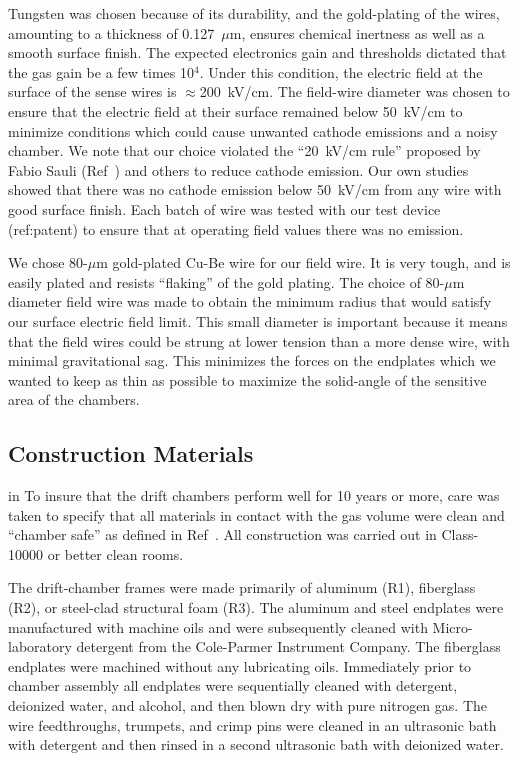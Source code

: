 Tungsten was chosen because of its durability, 
and the gold-plating of the wires, amounting to a thickness of 0.127~$\mu$m, 
ensures chemical inertness as well as a smooth surface finish.  The expected 
electronics gain and thresholds dictated that the gas gain be a few times 
10$^4$.  Under this condition, the electric field at the surface of the sense 
wires is $\approx$200~kV/cm.  The field-wire diameter was chosen to ensure 
that the electric field at their surface remained below 50~kV/cm to minimize 
conditions which could cause unwanted cathode emissions and a noisy chamber.  We note that
our choice violated the ``20~kV/cm rule'' proposed by Fabio Sauli (Ref~\cite{sauli_cathode_emission}) and others
to reduce cathode emission.  Our own studies showed that there was no cathode
emission below 50~kV/cm from any wire with good surface finish.  Each batch
of wire was tested with our test device (ref:patent) to ensure that at operating field 
values there was no emission.  

We chose 80-$\mu$m gold-plated Cu-Be wire for our field wire.
It is very tough, and is easily plated and resists ``flaking'' of the gold
plating.  The choice of 80-$\mu$m diameter field wire was made to obtain the minimum
radius that would satisfy our surface electric field limit.  This small
diameter is important because it means that the field wires could be strung 
at lower tension than a more dense wire, with minimal gravitational sag.  
This minimizes the forces on the endplates which we wanted to keep as 
thin as possible to maximize the solid-angle of the sensitive area of
the chambers.


\subsection{Construction Materials}

 in
To insure that the drift chambers perform well for 10 years or more, care was taken to 
specify that all materials in contact with the gas volume were clean and ``chamber 
safe'' as defined in Ref~\cite{kadyk}.  All construction was carried out in 
Class-10000 or better clean rooms.

The drift-chamber frames were made primarily of aluminum (R1), fiberglass (R2),
or steel-clad structural foam (R3).  The aluminum and steel endplates were 
manufactured with machine oils and were subsequently cleaned with  
Micro-laboratory detergent from the Cole-Parmer Instrument Company.  The 
fiberglass endplates were machined without any lubricating oils.  Immediately 
prior to chamber assembly all endplates were sequentially cleaned with 
detergent,
 deionized water, and alcohol, and then blown dry with pure nitrogen gas.  The 
wire feedthroughs, trumpets, and crimp pins were cleaned in an ultrasonic bath 
with detergent and then rinsed in a second ultrasonic bath with deionized water.

